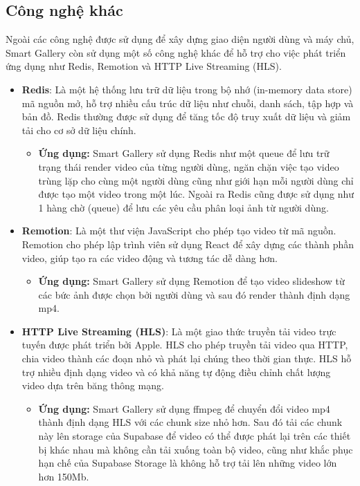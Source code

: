 \subsection{Công nghệ khác}

Ngoài các công nghệ được sử dụng để xây dựng giao diện người dùng và máy chủ, Smart Gallery còn sử dụng một số công nghệ khác để hỗ trợ cho việc phát triển ứng dụng như Redis, Remotion và HTTP Live Streaming (HLS).
\begin{itemize}
    \item \textbf{Redis}\cite{redisdoc}: Là một hệ thống lưu trữ dữ liệu trong bộ nhớ (in-memory data store) mã nguồn mở, hỗ trợ nhiều cấu trúc dữ liệu như chuỗi, danh sách, tập hợp và bản đồ. Redis thường được sử dụng để tăng tốc độ truy xuất dữ liệu và giảm tải cho cơ sở dữ liệu chính.
    \begin{itemize}
        \item \textbf{Ứng dụng:} Smart Gallery sử dụng Redis như một queue để lưu trữ trạng thái render video của từng người dùng, ngăn chặn việc tạo video trùng lặp cho cùng một người dùng cũng như giới hạn mỗi người dùng chỉ được tạo một video trong một lúc. Ngoài ra Redis cũng được sử dụng như 1 hàng chờ (queue) để lưu các yêu cầu phân loại ảnh từ người dùng. 
    \end{itemize}
    
    \item \textbf{Remotion}\cite{remotion}: Là một thư viện JavaScript cho phép tạo video từ mã nguồn. Remotion cho phép lập trình viên sử dụng React để xây dựng các thành phần video, giúp tạo ra các video động và tương tác dễ dàng hơn.
    \begin{itemize}
        \item \textbf{Ứng dụng:} Smart Gallery sử dụng Remotion để tạo video slideshow từ các bức ảnh được chọn bởi người dùng và sau đó render thành định dạng mp4.
    \end{itemize}
    
    \item \textbf{HTTP Live Streaming (HLS)}\cite{hls}: Là một giao thức truyền tải video trực tuyến được phát triển bởi Apple. HLS cho phép truyền tải video qua HTTP, chia video thành các đoạn nhỏ và phát lại chúng theo thời gian thực. HLS hỗ trợ nhiều định dạng video và có khả năng tự động điều chỉnh chất lượng video dựa trên băng thông mạng.
    \begin{itemize}
        \item \textbf{Ứng dụng:} Smart Gallery sử dụng ffmpeg\cite{ffmpeg} để chuyển đổi video mp4 thành định dạng HLS với các chunk size nhỏ hơn. Sau đó tải các chunk này lên storage của Supabase để video có thể được phát lại trên các thiết bị khác nhau mà không cần tải xuống toàn bộ video, cũng như khắc phục hạn chế của Supabase Storage là không hỗ trợ tải lên những video lớn hơn 150Mb.
    \end{itemize}
\end{itemize}